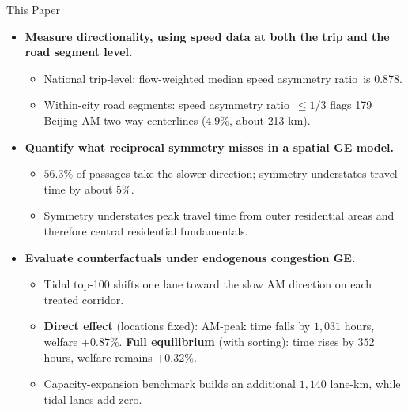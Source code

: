 \documentclass[11pt,aspectratio=169]{beamer}
\newcommand{\good}[1]{\textcolor{blue!70!black}{#1}}
\newcommand{\bad}[1]{\textcolor{red!70!black}{#1}}
\newcommand{\SAR}{speed asymmetry ratio}
\begin{document}
\begin{frame}{This Paper}
\small
\begin{itemize}
  \item \textbf{Measure directionality, using speed data at both the trip and the road segment level.}
  \begin{itemize}\footnotesize
    \item National trip-level: flow-weighted median \SAR\ is \good{0.878}.
    \item Within-city road segments: \SAR\ $\leq1/3$ flags \good{179} Beijing AM two-way centerlines (\good{4.9\%}, about \good{213 km}).
  \end{itemize}
  \item \textbf{Quantify what reciprocal symmetry misses in a spatial GE model.}
  \begin{itemize}\footnotesize
    \item \good{$56.3\%$} of passages take the slower direction; symmetry understates travel time by \good{about $5\%$}.
    \item Symmetry understates peak travel time from outer residential areas and therefore central residential fundamentals.
  \end{itemize}
  \item \textbf{Evaluate counterfactuals under endogenous congestion GE.}
  \begin{itemize}\footnotesize
    \item Tidal top-100 shifts one lane toward the slow AM direction on each treated corridor.
    \item \textbf{Direct effect} (locations fixed): AM-peak time falls by \good{$1{,}031$ hours}, welfare \good{$+0.87\%$}. \textbf{Full equilibrium} (with sorting): time rises by \bad{$352$ hours}, welfare remains \good{$+0.32\%$}.
    \item Capacity-expansion benchmark builds an additional \good{$1{,}140$ lane-km}, while tidal lanes add \good{zero}.
  \end{itemize}
\end{itemize}
\end{frame}
\end{document}
